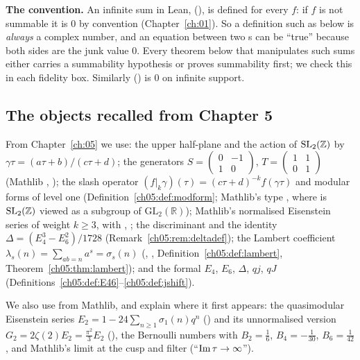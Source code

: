 \begin{warning}
\textbf{The  convention.} An infinite sum in Lean,  (), is defined for every $f$: if
$f$ is not summable it is $0$ by convention (Chapter~\ref{ch:01}). So a definition such as  below is
\emph{always} a complex number, and an equation between two s can be ``true'' because both sides are the junk
value $0$. Every theorem below that manipulates such sums either carries a summability hypothesis or proves summability
first; we check this in each fidelity box. Similarly  () is $0$ on infinite support.
\end{warning}

\subsection{The objects recalled from Chapter 5}

From Chapter~\ref{ch:05} we use: the upper half-plane and the action of $\mathrm{SL}_2(\mathbb{Z})$ by $\gamma\tau = (a\tau+b)/(c\tau+d)$;
the generators $S = \left(\begin{smallmatrix}0&-1\\1&0\end{smallmatrix}\right)$, $T =
\left(\begin{smallmatrix}1&1\\0&1\end{smallmatrix}\right)$ (Mathlib , ); the
slash operator $(f|_k\gamma)(\tau) = (c\tau+d)^{-k}f(\gamma\tau)$ and modular forms of level one
(Definition~\ref{ch05:def:modform}; Mathlib's type , where  is $\mathrm{SL}_2(\mathbb{Z})$ viewed as a
subgroup of $\mathrm{GL}_2(\mathbb R)$); Mathlib's normalised Eisenstein series  of weight
$k\ge3$, with , ; the discriminant  and the
identity $\Delta = (E_4^3-E_6^2)/1728$ (Remark~\ref{ch05:rem:deltadef}); the Lambert coefficient
$\lambda_s(n) = \sum_{ab=n}a^s = \sigma_s(n)$ (, ,
Definition~\ref{ch05:def:lambert}, Theorem~\ref{ch05:thm:lambert}); and the formal $E_4$, $E_6$, $\Delta$, $qj$, $qJ$
(Definitions~\ref{ch05:def:E46}--\ref{ch05:def:jshift}).

We also use from Mathlib, and explain where it first appears: the quasimodular Eisenstein series
$E_2 = 1 - 24\sum_{n\ge1}\sigma_1(n)q^n$ () and its unnormalised version
$G_2 = 2\zeta(2)E_2 = \frac{\pi^2}{3}E_2$ (), the Bernoulli numbers  with
$B_2 = \tfrac16$, $B_4 = -\tfrac1{30}$, $B_6 = \tfrac1{42}$, and Mathlib's limit at the cusp
 and filter  (``$\operatorname{Im}\tau\to\infty$'').

